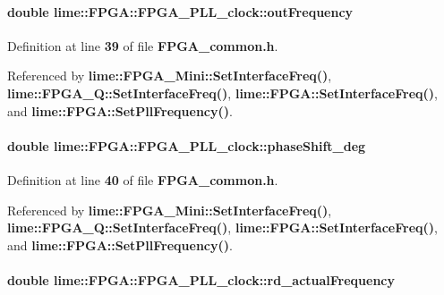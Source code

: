 \paragraph[{out\+Frequency}]{\setlength{\rightskip}{0pt plus 5cm}double lime\+::\+F\+P\+G\+A\+::\+F\+P\+G\+A\+\_\+\+P\+L\+L\+\_\+clock\+::out\+Frequency}\label{structlime_1_1FPGA_1_1FPGA__PLL__clock_ae4722a65d9832c290437d41ff2b1b4df}


Definition at line {\bf 39} of file {\bf F\+P\+G\+A\+\_\+common.\+h}.



Referenced by {\bf lime\+::\+F\+P\+G\+A\+\_\+\+Mini\+::\+Set\+Interface\+Freq()}, {\bf lime\+::\+F\+P\+G\+A\+\_\+\+Q\+::\+Set\+Interface\+Freq()}, {\bf lime\+::\+F\+P\+G\+A\+::\+Set\+Interface\+Freq()}, and {\bf lime\+::\+F\+P\+G\+A\+::\+Set\+Pll\+Frequency()}.

\paragraph[{phase\+Shift\+\_\+deg}]{\setlength{\rightskip}{0pt plus 5cm}double lime\+::\+F\+P\+G\+A\+::\+F\+P\+G\+A\+\_\+\+P\+L\+L\+\_\+clock\+::phase\+Shift\+\_\+deg}\label{structlime_1_1FPGA_1_1FPGA__PLL__clock_a7685c7ae1c138cb57689c48040a87a43}


Definition at line {\bf 40} of file {\bf F\+P\+G\+A\+\_\+common.\+h}.



Referenced by {\bf lime\+::\+F\+P\+G\+A\+\_\+\+Mini\+::\+Set\+Interface\+Freq()}, {\bf lime\+::\+F\+P\+G\+A\+\_\+\+Q\+::\+Set\+Interface\+Freq()}, {\bf lime\+::\+F\+P\+G\+A\+::\+Set\+Interface\+Freq()}, and {\bf lime\+::\+F\+P\+G\+A\+::\+Set\+Pll\+Frequency()}.

\paragraph[{rd\+\_\+actual\+Frequency}]{\setlength{\rightskip}{0pt plus 5cm}double lime\+::\+F\+P\+G\+A\+::\+F\+P\+G\+A\+\_\+\+P\+L\+L\+\_\+clock\+::rd\+\_\+actual\+Frequency}\label{structlime_1_1FPGA_1_1FPGA__PLL__clock_a50c47b512688f319569b8379edcb993b}


